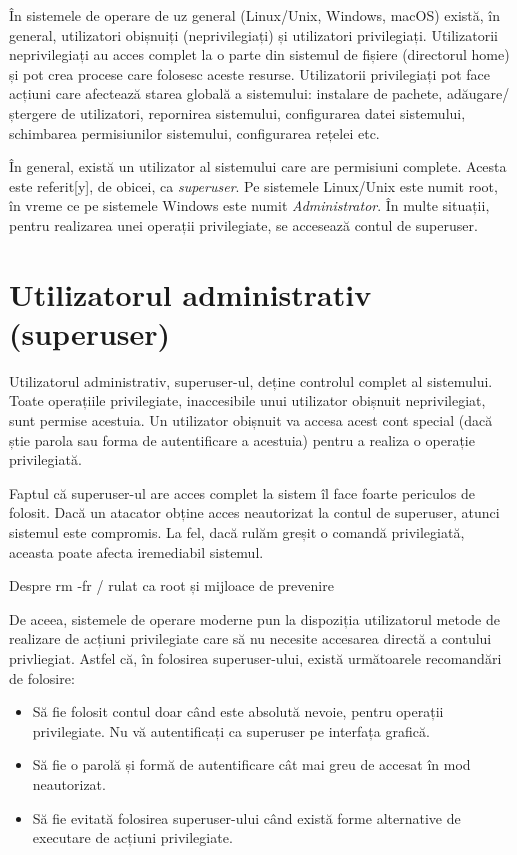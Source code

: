 În sistemele de operare de uz general (Linux/Unix, Windows, macOS) există, în
general, utilizatori obișnuiți (neprivilegiați) și utilizatori privilegiați.
Utilizatorii neprivilegiați au acces complet la o parte din sistemul de fișiere
(directorul home) și pot crea procese care folosesc aceste resurse. Utilizatorii
privilegiați pot face acțiuni care afectează starea globală a sistemului:
instalare de pachete, adăugare/ștergere de utilizatori, repornirea sistemului,
configurarea datei sistemului, schimbarea permisiunilor sistemului, configurarea
rețelei etc.

În general, există un utilizator al sistemului care are permisiuni complete.
Acesta este referit[y], de obicei, ca \textit{superuser}. Pe sistemele
Linux/Unix este numit root, în vreme ce pe sistemele Windows este numit
\textit{Administrator}. În multe situații, pentru realizarea unei operații
privilegiate, se accesează contul de superuser.

\section{Utilizatorul administrativ (superuser)}
\label{sec:users-superuser}

Utilizatorul administrativ, superuser-ul, deține controlul complet al
sistemului. Toate operațiile privilegiate, inaccesibile unui utilizator obișnuit
neprivilegiat, sunt permise acestuia. Un utilizator obișnuit va accesa acest
cont special (dacă știe parola sau forma de autentificare a acestuia) pentru a
realiza o operație privilegiată.

Faptul că superuser-ul are acces complet la sistem îl face foarte periculos de
folosit. Dacă un atacator obține acces neautorizat la contul de superuser,
atunci sistemul este compromis. La fel, dacă rulăm greșit o comandă
privilegiată, aceasta poate afecta iremediabil sistemul.

\begin{note}

Despre rm -fr / rulat ca root și mijloace de prevenire

\end{note}

De aceea, sistemele de operare moderne pun la dispoziția utilizatorul metode de
realizare de acțiuni privilegiate care să nu necesite accesarea directă a
contului privliegiat. Astfel că, în folosirea superuser-ului, există următoarele
recomandări de folosire:

\begin{itemize}
	\item Să fie folosit contul doar când este absolută nevoie, pentru
		operații privilegiate. Nu vă autentificați ca superuser pe
		interfața grafică.
	\item Să fie o parolă și formă de autentificare cât mai greu de accesat
		în mod neautorizat.
	\item Să fie evitată folosirea superuser-ului când există forme
		alternative de executare de acțiuni privilegiate.
\end{itemize}

